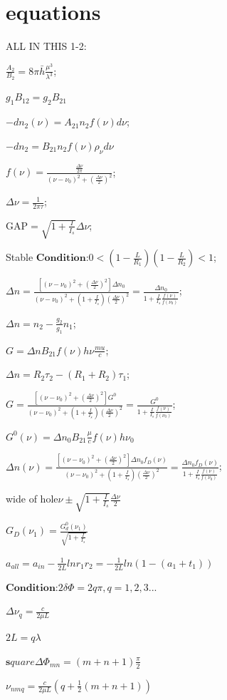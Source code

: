 \documentclass{article}
\begin{document}
\section{equations}
ALL IN THIS
1-2:


$\frac{A_2}{B_2}=8\pi \bar h \frac{\mu^3}{\lambda^3}$;

$g_1 B_{12}=g_2B_{21}$

$-dn_2(\nu)=A_{21}n_2f(\nu)d\nu$;

$-dn_2=B_{21}n_2f(\nu)\rho_{\nu} d\nu$

$f(\nu)=\frac{\frac{\Delta\nu}{2\pi}}{(\nu-\nu_0)^2+(\frac{\Delta\nu}{2})^2}$;

$\Delta\nu=\frac1{2\pi\tau}$;

GAP$=\sqrt{1+\frac{I}{I_s}}\Delta\nu$;

Stable $\bm{Condition}$:$0<(1-\frac L{R_1})(1-\frac L{R_2})<1$;

$\Delta n=\frac{[(\nu-\nu_0)^2+(\frac{\Delta\nu}{2})^2]\Delta n_0}{(\nu-\nu_0)^2+(1+\frac{I}{I_s})(\frac{\Delta\nu}{2})^2}=\frac{\Delta n_0}{1+\frac{I}{I_s}\frac{f(\nu)}{f(\nu_0)}}$;

$\Delta n=n_2-\frac{g_2}{g_1}n_1$;

$G=\Delta nB_{21}f(\nu)h\nu\frac{mu}{c}$;

$\Delta n=R_2\tau_2-(R_1+R_2)\tau_1$;

$G=\frac{[(\nu-\nu_0)^2+(\frac{\Delta\nu}{2})^2]G^0}{(\nu-\nu_0)^2+(1+\frac{I}{I_s})(\frac{\Delta\nu}{2})^2}=\frac{G^0}{1+\frac{I}{I_s}\frac{f(\nu)}{f(\nu_0)}}$;

$G^0(\nu)=\Delta n_0B_{21}\frac{\mu}{c}f(\nu)h\nu_0$

$\Delta n(\nu)=\frac{[(\nu-\nu_0)^2+(\frac{\Delta\nu}{2})^2]\Delta n_0f_D(\nu)}{(\nu-\nu_0)^2+(1+\frac{I}{I_s})(\frac{\Delta\nu}{2})^2}=\frac{\Delta n_0f_D(\nu)}{1+\frac{I}{I_s}\frac{f(\nu)}{f(\nu_0)}}$;

wide of hole$\nu\pm\sqrt{1+\frac{I}{I_s}}\frac{\Delta\nu}{2}$

$G_D(\nu_1)=\frac{G_d^0(\nu_1)}{\sqrt{1+\frac{I}{I_s}}}$

$a_{all}=a_{in}-\frac1{2L}lnr_1r_2=-\frac1{2L}ln(1-(a_1+t_1))$

$\bm{Condition}$:$2\delta\Phi=2q\pi,q=1,2,3...$

$\Delta\nu_q=\frac{c}{2\mu L}$

$2L=q\lambda$

$\bm square\Delta\Phi_{mn}=(m+n+1)\frac{\pi}2$

$\nu_{nmq}=\frac c{2\mu L}(q+\frac12(m+n+1))$
\end{document}

